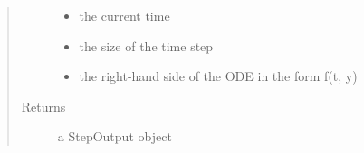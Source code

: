 \documentclass[letterpaper,10pt,english]{sphinxmanual}
\begin{document}
\begin{fulllineitems}
\begin{fulllineitems}
\begin{quote}
\begin{description}
\begin{itemize}
\item {} 
 \textendash{} the current time

\item {} 
 \textendash{} the size of the time step

\item {} 
 \textendash{} the right-hand side of the ODE in the form f(t, y)

\end{itemize}

\item[{Returns}] \leavevmode
a StepOutput object

\end{description}\end{quote}

\end{fulllineitems}


\end{fulllineitems}

\end{document}
